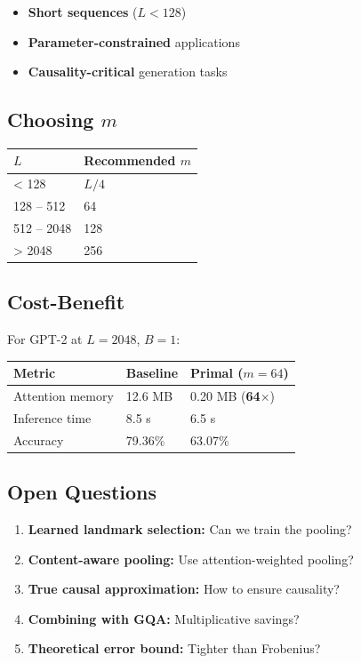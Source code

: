 \begin{itemize}
\item \textbf{Short sequences} ($L < 128$)
\item \textbf{Parameter-constrained} applications
\item \textbf{Causality-critical} generation tasks

\end{itemize}
\subsection{Choosing $m$}

\begin{table}[H]
\centering
\small
\begin{tabular}{ll}
\toprule
\textbf{$L$} & \textbf{Recommended $m$} \\
\midrule
< 128 & $L / 4$ \\
128 -- 512 & 64 \\
512 -- 2048 & 128 \\
> 2048 & 256 \\
\bottomrule
\end{tabular}
\end{table}

\subsection{Cost-Benefit}

For GPT-2 at $L = 2048$, $B = 1$:

\begin{table}[H]
\centering
\small
\begin{tabular}{lll}
\toprule
\textbf{Metric} & \textbf{Baseline} & \textbf{Primal ($m=64$)} \\
\midrule
Attention memory & 12.6 MB & 0.20 MB (\textbf{64$\times$}) \\
Inference time & 8.5 s & 6.5 s \\
Accuracy & 79.36\% & 63.07\% \\
\bottomrule
\end{tabular}
\end{table}

\subsection{Open Questions}

\begin{enumerate}
\item \textbf{Learned landmark selection:} Can we train the pooling?
\item \textbf{Content-aware pooling:} Use attention-weighted pooling?
\item \textbf{True causal approximation:} How to ensure causality?
\item \textbf{Combining with GQA:} Multiplicative savings?
\item \textbf{Theoretical error bound:} Tighter than Frobenius?

\end{enumerate}
